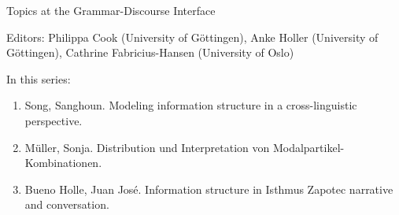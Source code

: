 {\large  Topics at the Grammar-Discourse Interface}

\bigskip

Editors: Philippa Cook (University of Göttingen),
Anke Holler (University of Göttingen),
Cathrine Fabricius-Hansen (University of Oslo)

\bigskip

In this series:

\begin{enumerate}
\item Song, Sanghoun. Modeling information structure in a cross-linguistic perspective.
\item Müller, Sonja. Distribution und Interpretation von Modalpartikel-Kombinationen.
\item Bueno Holle, Juan José. Information structure in Isthmus Zapotec narrative and conversation.
\end{enumerate}

 
